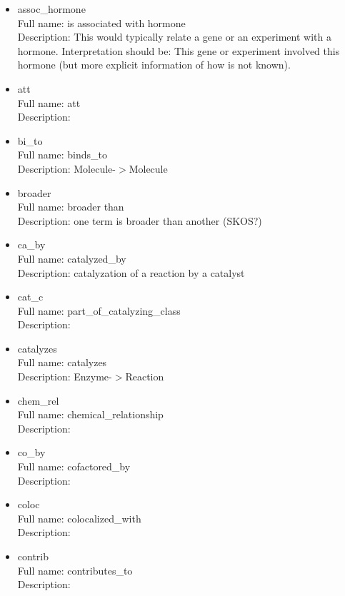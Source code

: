 \begin{itemize}
\item{assoc\_hormone}\\ Full name: is associated with hormone\\ Description: This would typically relate a gene or an experiment with a hormone. Interpretation should be: This gene or experiment involved this hormone (but more explicit information of how is not known). 

\item{att}\\ Full name: att\\ Description: 

\item{bi\_to}\\ Full name: binds\_to\\ Description: Molecule-$>$Molecule 

\item{broader}\\ Full name: broader than\\ Description: one term is broader than another (SKOS?) 

\item{ca\_by}\\ Full name: catalyzed\_by\\ Description: catalyzation of a reaction by a catalyst 

\item{cat\_c}\\ Full name: part\_of\_catalyzing\_class\\ Description: 

\item{catalyzes}\\ Full name: catalyzes\\ Description: Enzyme-$>$Reaction 

\item{chem\_rel}\\ Full name: chemical\_relationship\\ Description: 

\item{co\_by}\\ Full name: cofactored\_by\\ Description: 

\item{coloc}\\ Full name: colocalized\_with\\ Description: 

\item{contrib}\\ Full name: contributes\_to\\ Description: 


\end{itemize}
